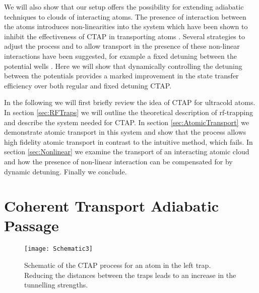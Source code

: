 We will also show that our setup offers the possibility for extending
adiabatic techniques to clouds of interacting atoms. The presence of
interaction between the atoms introduces non-linearities into the
system \cite{Liu:06} which have been shown to inhibit the
effectiveness of CTAP in transporting atoms \cite{Rab:08}. Several
strategies to adjust the process and to allow transport in the
presence of these non-linear interactions have been suggested, for
example a fixed detuning between the potential wells
\cite{Graefe:06}. Here we will show that dynamically controlling the
detuning between the potentials provides a marked improvement in the
state transfer efficiency over both regular and fixed detuning CTAP.

In the following we will first briefly review the idea of CTAP for
ultracold atoms. In section \ref{sec:RFTraps} we will outline the
theoretical description of rf-trapping and describe the system needed
for CTAP. In section \ref{sec:AtomicTransport} we demonstrate atomic
transport in this system and show that the process allows high
fidelity atomic transport in contrast to the intuitive method, which
fails. In section \ref{sec:Nonlinear} we examine the transport
of an interacting atomic cloud and how the presence of non-linear
interaction can be compensated for by dynamic detuning. Finally we
conclude.

\section{Coherent Transport Adiabatic Passage}
\label{sec:CTAP}

\begin{figure}
  \texttt{[image: Schematic3]}
  \caption{Schematic of the CTAP process for an atom in the left trap. 
  Reducing the distances between the traps leads to an increase in the 
  tunnelling strengths.}
  \label{fig:Schematic}
\end{figure}

